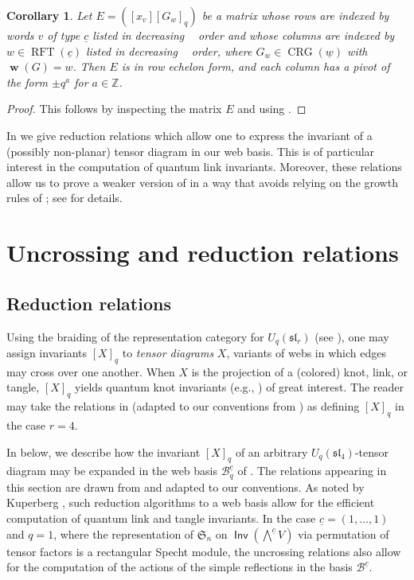 \documentclass{amsart}
\newtheorem{corollary}[theorem]{Corollary}
\theoremstyle{definition}
\theoremstyle{remark}
\numberwithin{equation}{section}
\DeclareMathOperator{\bw}{\mathbf{w}}
\DeclareMathOperator{\rft}{RFT}
\newcommand{\fsl}{\mathfrak{sl}}
\DeclareMathOperator{\Inv}{\mathsf{Inv}}
\DeclareMathOperator{\crg}{CRG}
\DeclareMathOperator{\tlex}{l\widetilde{ex}}
\begin{document}
\begin{corollary}\label{thm:unitriangular.canonical}
  Let $E = ([x_v] [G_w]_q)$ be a matrix whose rows are indexed by words $v$ of type $\underline{c}$ listed in decreasing $\tlex$ order and whose columns are indexed by $w \in \rft(\underline{c})$ listed in decreasing $\tlex$ order, where $G_w \in \crg(\underline{w})$ with $\bw(G) = w$. Then $E$ is in row echelon form, and each column has a pivot of the form $\pm q^a$ for $a \in \mathbb{Z}$.
\end{corollary}

\begin{proof}
  This follows by inspecting the matrix $E$ and using .
\end{proof}


In  we give reduction relations which allow one to express the invariant of a (possibly non-planar) tensor diagram in our web basis. This is of particular interest in the computation of quantum link invariants. Moreover, these relations allow us to prove a weaker version of  in a way that avoids relying on the growth rules of ; see  for details.

\section{Uncrossing and reduction relations}
\label{sec:reduction-rules}

\subsection{Reduction relations}
\label{sec:reduction_relations}
Using the braiding of the representation category for $U_q(\fsl_r)$ (see \cite[\S 6]{Cautis-Kamnitzer-Morrison}), one may assign invariants $[X]_q$ to \emph{tensor diagrams} $X$, variants of webs in which edges may cross over one another. When $X$ is the projection of a (colored) knot, link, or tangle, $[X]_q$ yields quantum knot invariants (e.g., \cite{Jones, Kauffman,Turaev,Khovanov:Jones,Khovanov:sl3,Morrison.Nieh}) of great interest. The reader may take the relations in  (adapted to our conventions from \cite[Cor.~6.2.3]{Cautis-Kamnitzer-Morrison}) as defining $[X]_q$ in the case $r=4$. 

In  below, we describe how the invariant $[X]_q$ of an arbitrary $U_q(\fsl_4)$-tensor diagram may be expanded in the web basis $\mathscr{B}_q^{\underline{c}}$ of . The relations appearing in this section are drawn from \cite{Cautis-Kamnitzer-Morrison} and adapted to our conventions. As noted by Kuperberg \cite[\S 8.3]{Kuperberg}, such reduction algorithms to a web basis allow for the efficient computation of quantum link and tangle invariants. In the case $\underline{c}=(1,\ldots,1)$ and $q=1$, where the representation of $\mathfrak{S}_n$ on $\Inv(\bigwedge\nolimits^{\underline{c}} V)$ via permutation of tensor factors is a rectangular Specht module, the uncrossing relations also allow for the computation of the actions of the simple reflections in the basis $\mathscr{B}^{\underline{c}}$.
\end{document}
